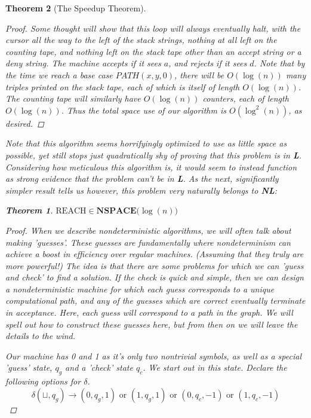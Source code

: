 \documentclass{article}
\theoremstyle{definition}
\theoremstyle{plain}
\theoremstyle{theorem}
\newtheorem{theorem}{Theorem}[section]
\begin{document}
\begin{theorem}[The Speedup Theorem]
\begin{proof}
\par Some thought will show that this loop will always eventually halt, with the cursor all the way to the left of the stack strings, nothing at all left on the counting tape, and nothing left on the stack tape other than an accept string or a deny string. The machine accepts if it sees $a$, and rejects if it sees $d$.
Note that by the time we reach a base case $PATH(x,y,0)$, there will be $O(\log(n))$ many triples printed on the stack tape, each of which is itself of length $O(\log(n))$. The counting tape will similarly have $O(\log(n))$ counters, each of length $O(\log(n))$. Thus the total space use of our algorithm is $O(\log^2(n))$, as desired. 
\end{proof}
Note that this algorithm seems horrifyingly optimized to use as little space as possible, yet still stops just quadratically shy of proving that this problem is in \textbf{L}. Considering how meticulous this algorithm is, it would seem to instead function as strong evidence that the problem \textit{can't} be in \textbf{L}. As the next, significantly simpler result tells us however, this problem very naturally belongs to \textbf{NL}:
\begin{theorem} 
$\textrm{REACH} \in \textbf{NSPACE($\log(n)$)}$
\end{theorem}
\begin{proof}
When we describe nondeterministic algorithms, we will often talk about making 'guesses'. These guesses are fundamentally where nondeterminism can achieve a boost in efficiency over regular machines. (Assuming that they truly are more powerful!) The idea is that there are some problems for which we can 'guess and check' to find a solution. If the check is quick and simple, then we can design a nondeterministic machine for which each guess corresponds to a unique computational path, and any of the guesses which are correct eventually terminate in acceptance. Here, each guess will correspond to a path in the graph. We will spell out how to construct these guesses here, but from then on we will leave the details to the wind. 
\par Our machine has 0 and 1 as it's only two nontrivial symbols, as well as a special 'guess' state, $q_g$ and a 'check' state $q_c$. We start out in this state. Declare the following options for $\delta$.
\[\delta(\sqcup, q_g) \to (0,q_g,1) \textrm{ or } (1,q_g,1) \textrm{ or } (0,q_c,-1) \textrm{ or } (1,q_c,-1) \]

\end{proof}
\end{theorem}
\end{document}
